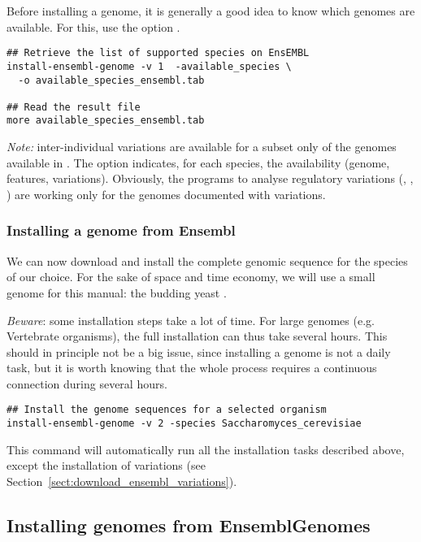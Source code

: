 Before installing a genome, it is generally a good idea to know which
genomes are available. For this, use the option
.

\begin{lstlisting}
## Retrieve the list of supported species on EnsEMBL
install-ensembl-genome -v 1  -available_species \
  -o available_species_ensembl.tab

## Read the result file
more available_species_ensembl.tab
\end{lstlisting}

\emph{Note:} inter-individual variations are available for a subset
only of the genomes available in \ensembl. The option
 indicates, for each species, the
availability (genome, features, variations). Obviously, the programs
to analyse regulatory variations (\program{convert-variations},
, ) are
working only for the genomes documented with variations.

\subsubsection{Installing a genome from Ensembl}

We can now download and install the complete genomic sequence for the
species of our choice. For the sake of space and time economy, we will
use a small genome for this manual: the budding yeast
.

\emph{Beware}: some installation steps take a lot of time. For large
genomes (e.g. Vertebrate organisms), the full installation can thus
take several hours. This should in principle not be a big issue, since
installing a genome is not a daily task, but it is worth knowing that
the whole process requires a continuous connection during several
hours.

\begin{lstlisting}
## Install the genome sequences for a selected organism
install-ensembl-genome -v 2 -species Saccharomyces_cerevisiae
\end{lstlisting}

This command will automatically run all the installation tasks
described above, except the installation of variations (see
Section~\ref{sect:download_ensembl_variations}).

\subsection{Installing genomes from EnsemblGenomes}


